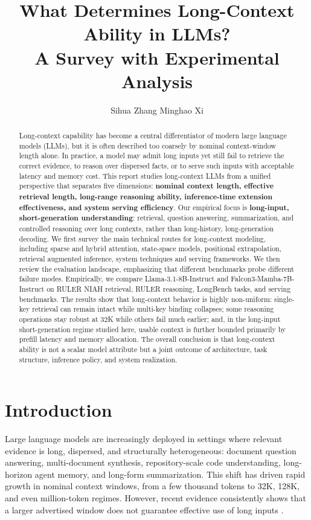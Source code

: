\documentclass{article}
\title{What Determines Long-Context Ability in LLMs?\\A Survey with Experimental Analysis}
\author{
Sihua Zhang \And Minghao Xi
}
\begin{document}
\ifcolmsubmission
\linenumbers
\fi

\maketitle

\begin{abstract}
Long-context capability has become a central differentiator of modern large language models (LLMs), but it is often described too coarsely by nominal context-window length alone. In practice, a model may admit long inputs yet still fail to retrieve the correct evidence, to reason over dispersed facts, or to serve such inputs with acceptable latency and memory cost. This report studies long-context LLMs from a unified perspective that separates five dimensions: \textbf{nominal context length, effective retrieval length, long-range reasoning ability, inference-time extension effectiveness, and system serving efficiency}. Our empirical focus is \textbf{long-input, short-generation understanding}: retrieval, question answering, summarization, and controlled reasoning over long contexts, rather than long-history, long-generation decoding. We first survey the main technical routes for long-context modeling, including sparse and hybrid attention, state-space models, positional extrapolation, retrieval augmented inference, system techniques and serving frameworks. We then review the evaluation landscape, emphasizing that different benchmarks probe different failure modes. Empirically, we compare Llama-3.1-8B-Instruct and Falcon3-Mamba-7B-Instruct on RULER NIAH retrieval, RULER reasoning, LongBench tasks, and serving benchmarks. The results show that long-context behavior is highly non-uniform: single-key retrieval can remain intact while multi-key binding collapses; some reasoning operations stay robust at 32K while others fail much earlier; and, in the long-input short-generation regime studied here, usable context is further bounded primarily by prefill latency and memory allocation. The overall conclusion is that long-context ability is not a scalar model attribute but a joint outcome of architecture, task structure, inference policy, and system realization.
\end{abstract}

\section{Introduction}
Large language models are increasingly deployed in settings where relevant evidence is long, dispersed, and structurally heterogeneous: document question answering, multi-document synthesis, repository-scale code understanding, long-horizon agent memory, and long-form summarization. This shift has driven rapid growth in nominal context windows, from a few thousand tokens to 32K, 128K, and even million-token regimes. However, recent evidence consistently shows that a larger advertised window does not guarantee effective use of long inputs \citep{liu2024lost, hsieh2024ruler, bai2024longbench, kuratov2024babilong, bai2025longbenchv2}.
\end{document}
